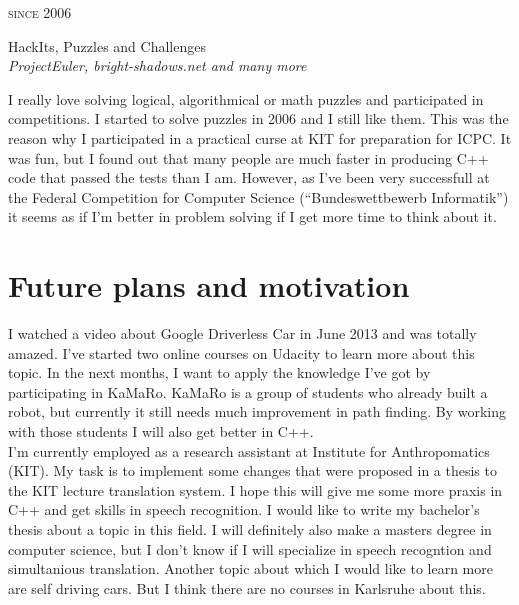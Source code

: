 \documentclass[a4paper,10pt]{article} %
\begin{document}
{\begin{minipage}[t]{0.5\textwidth}

{\raggedleft\textsc{since 2006}\par}

{\raggedright\large HackIts, Puzzles and Challenges\\
\textit{ProjectEuler, bright-shadows.net and many more}\\[5pt]}

\normalsize{I really love solving logical, algorithmical or math 
puzzles and participated in competitions. I started to solve puzzles 
in 2006 and I still like them. This was the reason why I participated 
in a practical curse at KIT for preparation for ICPC. It was fun, 
but I found out that many people are much faster in producing C++ 
code that passed the tests than I am.
However, as I've been very successfull at the Federal Competition for 
Computer Science (``Bundeswettbewerb Informatik'') it seems as if I'm 
better in problem solving if I get more time to think about it.}\\


\section{Future plans and motivation}

I watched a video about Google Driverless Car in June 2013 and was 
totally amazed. I've started two online courses on Udacity to learn
more about this topic. In the next months, I want to apply the knowledge
I've got by participating in KaMaRo.  KaMaRo
is a group of students who already built a robot, but currently
it still needs much improvement in path finding. By working with
those students I will also get better in C++.\\

I'm currently employed as a research assistant at Institute for Anthropomatics (KIT).
My task is to implement some changes that were proposed in a thesis 
to the KIT lecture translation system. I hope this will give me some
more praxis in C++ and get skills in speech recognition.
I would like to write my bachelor's thesis about a topic in this field.
I will definitely also make a masters degree in computer science, but
I don't know if I will specialize in speech recogntion and simultanious
translation. Another topic about which I would like to learn more
are self driving cars. But I think there are no courses in Karlsruhe
about this.\\


\end{minipage}}
\end{document}
